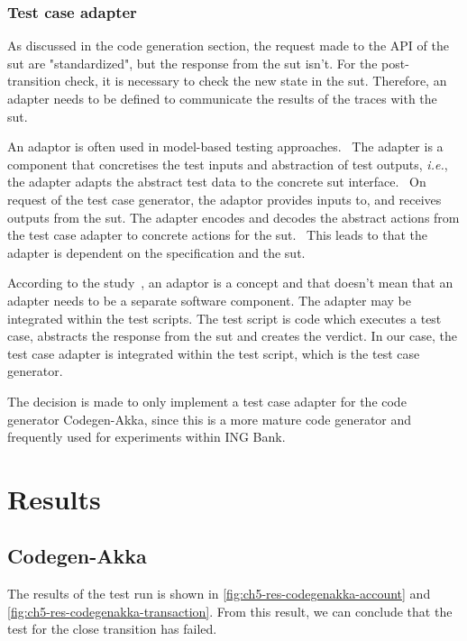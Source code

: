 \subsubsection{Test case adapter}\label{sec:ch5-adapter}
As discussed in the code generation section, the request made to the API of the
\gls{sut} are "standardized", but the response from the \gls{sut} isn't. For the
post-transition check, it is necessary to check the new state in the \gls{sut}.
Therefore, an adapter needs to be defined to communicate the results of the
traces with the \gls{sut}.

An adaptor is often used in model-based testing
approaches.~\cite{utting2012taxonomy, tretmans2003torx}
The adapter is a component that concretises the test inputs and abstraction of
test outputs, \textit{i.e.}, the adapter adapts the abstract test data to the
concrete \gls{sut} interface.~\cite[p.~4]{utting2012taxonomy}
On request of the test case generator, the adaptor provides inputs to, and
receives outputs from the \gls{sut}. The adapter encodes and decodes the
abstract actions from the test case adapter to concrete actions for the
\gls{sut}.~\cite[p.~5]{tretmans2003torx} This leads to that the adapter is
dependent on the specification and the \gls{sut}.

According to the study~\cite[p.~4]{utting2012taxonomy}, an adaptor is a concept
and that doesn't mean that an adapter needs to be a separate software component.
The adapter may be integrated within the test scripts. The test script is code
which executes a test case, abstracts the response from the \gls{sut} and
creates the verdict. In our case, the test case adapter is integrated within the
test script, which is the test case generator.

The decision is made to only implement a test case adapter for the code generator
Codegen-Akka, since this is a more mature code generator and frequently used for
experiments within ING Bank.

\section{Results}

\subsection{Codegen-Akka}

The results of the test run is shown in
\autoref{fig:ch5-res-codegenakka-account} and
\autoref{fig:ch5-res-codegenakka-transaction}. From this result, we can conclude
that the test for the close transition has failed.

